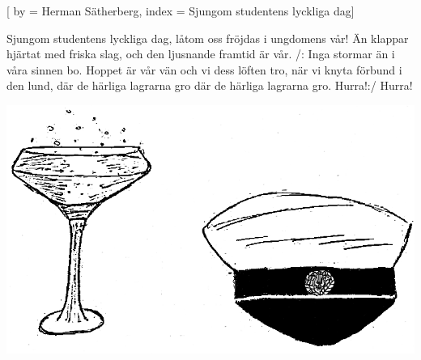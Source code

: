 

[ 
by = {Herman Sätherberg},
index = {Sjungom studentens lyckliga dag}]

\beginverse* 
Sjungom studentens lyckliga dag,
låtom oss fröjdas i ungdomens vår!
Än klappar hjärtat med friska slag,
och den ljusnande framtid är vår.
/: Inga stormar än 
i våra sinnen bo.
Hoppet är vår vän 
och vi dess löften tro,
när vi knyta förbund i den lund,
där de härliga lagrarna gro
där de härliga lagrarna gro.
Hurra!:/
Hurra!
\endverse
\endsong
\begin{intersong}
	\begin{center}
		\includegraphics[width=1\textwidth]{../bilder/fardigabilder/CamillasFardigaBilder/Studentsangen2.png} 
	\end{center}
\end{intersong}